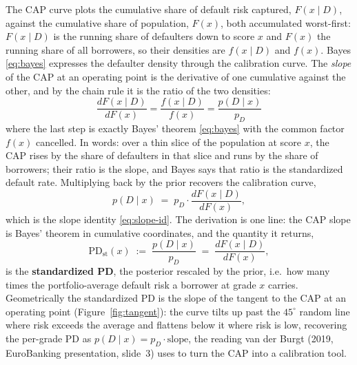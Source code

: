 \documentclass[12pt]{article}
\newcommand{\pD}{p_D}
\newcommand{\PDx}{p(D \mid x)}
\begin{document}
The CAP curve plots the cumulative share of default risk captured, $F(x\mid D)$, against the
cumulative share of population, $F(x)$, both accumulated worst-first: $F(x\mid D)$ is the
running share of defaulters down to score $x$ and $F(x)$ the running share of all borrowers, so
their densities are $f(x\mid D)$ and $f(x)$. Bayes \eqref{eq:bayes} expresses the defaulter
density through the calibration curve. The \emph{slope} of the CAP at an operating point is the
derivative of one cumulative against the other, and by the chain rule it is the ratio of the
two densities:
\begin{equation}\label{eq:cap-slope}
\boxed{\;
\frac{dF(x\mid D)}{dF(x)}
=\frac{f(x\mid D)}{f(x)}
=\frac{\PDx}{\pD}
\;}
\end{equation}
where the last step is exactly Bayes' theorem \eqref{eq:bayes} with the common factor $f(x)$
cancelled. In words: over a thin slice of the population at score $x$, the CAP rises by the
share of defaulters in that slice and runs by the share of borrowers; their ratio is the slope,
and Bayes says that ratio is the standardized default rate. Multiplying back by the prior
recovers the calibration curve,
\begin{equation}\label{eq:pd-from-slope}
\PDx \;=\; \pD\cdot\frac{dF(x\mid D)}{dF(x)},
\end{equation}
which is the slope identity \eqref{eq:slope-id}. The derivation is one line: the CAP slope is
Bayes' theorem in cumulative coordinates, and the quantity it returns,
\begin{equation}
\mathrm{PD}_{\text{st}}(x)\;:=\;\frac{\PDx}{\pD}\;=\;\frac{dF(x\mid D)}{dF(x)},
\end{equation}
is the \textbf{standardized PD}, the posterior rescaled by the prior, i.e.\ how many times
the portfolio-average default risk a borrower at grade $x$ carries. Geometrically the standardized PD is
the slope of the tangent to the CAP at an operating point (Figure~\ref{fig:tangent}): the curve
tilts up past the $45^\circ$ random line where risk exceeds the average and flattens below it
where risk is low, recovering the per-grade PD as $\PDx=\pD\cdot\text{slope}$, the reading van
der Burgt (2019, EuroBanking presentation, slide~3) uses to turn the CAP into a calibration tool.
\end{document}
